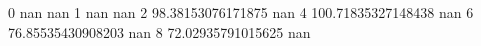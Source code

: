 0 nan nan
1 nan nan
2 98.38153076171875 nan
4 100.71835327148438 nan
6 76.85535430908203 nan
8 72.02935791015625 nan
